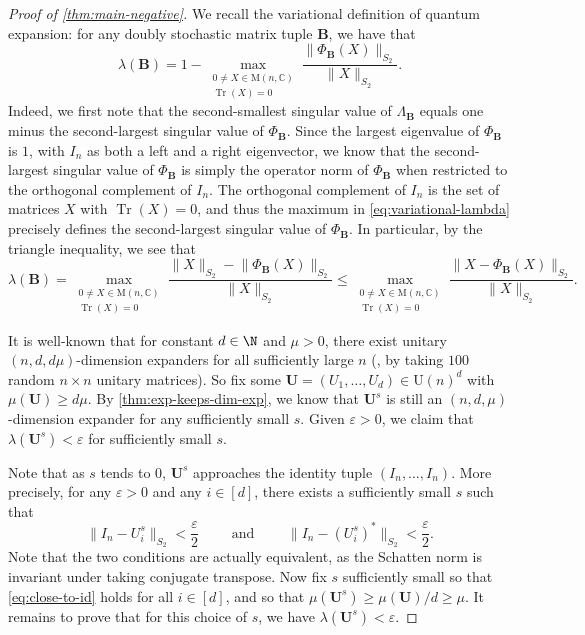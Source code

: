 \documentclass{toc}
\theoremstyle{plain}
\numberwithin{equation}{section}
\theoremstyle{definition}
\newcommand{\bC}{\mathbb{C}}
\DeclareMathOperator{\trace}{Tr}
\newcommand{\norm}[1]{\lVert#1\rVert}
\newcommand{\M}{\mathrm{M}}
\newcommand{\tuple}[1]{\mathbf{#1}}
\newcommand{\vB}{\tuple{B}}
\newcommand{\vU}{\tuple{U}}
\begin{document}
\begin{proof}[Proof of \cref{thm:main-negative}]

    We recall the variational definition of quantum expansion: for any doubly stochastic matrix tuple $\vB$, we have that
    \begin{equation}\label{eq:variational-lambda}
        \lambda(\vB) = 1- \max_{\substack{0 \neq X \in \M(n,\bC)\\\trace(X)=0}} \frac{\norm{\Phi_{\vB}(X)}_{S_2}}{\norm X_{S_2}}.
    \end{equation}
    Indeed, we first note that the second-smallest singular value of $\Lambda_{\vB}$ equals one minus the second-largest singular value of $\Phi_{\vB}$. Since the largest eigenvalue of $\Phi_{\vB}$ is $1$, with $I_n$ as both a left and a right eigenvector, we know that the second-largest singular value of $\Phi_{\vB}$ is simply the operator norm of $\Phi_{\vB}$ when restricted to the orthogonal complement of $I_n$. The orthogonal complement of $I_n$ is the set of matrices $X$ with $\trace(X)=0$, and thus the maximum in \eqref{eq:variational-lambda} precisely defines the second-largest singular value of $\Phi_{\vB}$. In particular, by the triangle inequality, we see that
    \begin{equation}
        \lambda(\vB) = \max_{\substack{0 \neq X \in \M(n,\bC)\\\trace(X)=0}} \frac{\norm X_{S_2} - \norm{\Phi_\vB(X)}_{S_2}}{\norm X_{S_2}} \leq \max_{\substack{0 \neq X \in \M(n,\bC)\\\trace(X)=0}} \frac{\norm{X-\Phi_\vB(X)}_{S_2}}{\norm X_{S_2}}. \label{eq:lambda-ub}
    \end{equation}

  It is well-known that for constant $d \in \N$ and $\mu>0$, there exist unitary $(n,d,d\mu)$-dimension expanders for all sufficiently large $n$ (\eg, by taking $100$ random $n \times n$ unitary matrices). So fix some $\vU=(U_1,\dots,U_d)\in \mathrm{U}(n)^d$ with $\mu(\vU) \geq d\mu$. By \cref{thm:exp-keeps-dim-exp}, we know that $\vU^s$ is still an $(n,d,\mu)$-dimension expander for any sufficiently small $s$. Given $\varepsilon>0$, we claim that $\lambda(\vU^s)< \varepsilon$ for sufficiently small $s$.

    Note that as $s$ tends to $0$, $\vU^s$ approaches the identity tuple $(I_n,\dots,I_n)$. More precisely, for any $\varepsilon>0$ and any $i\in[d]$, there exists a sufficiently small $s$ such that 
    \begin{equation}\label{eq:close-to-id}
         \norm{I_n - U_i^s}_{S_2}<\frac \varepsilon 2 \qquad \text{ and } \qquad \norm{I_n - (U_i^s)^*}_{S_2} < \frac \varepsilon 2.
    \end{equation}
    Note that the two conditions are actually equivalent, as the Schatten norm is invariant under taking conjugate transpose.
    Now fix $s$ sufficiently small so that \eqref{eq:close-to-id} holds for all $i \in [d]$, and so that $\mu(\vU^s) \geq \mu(\vU)/d \geq \mu$. It remains to prove that for this choice of $s$, we have $\lambda(\vU^s)<\varepsilon$. 


\end{proof}
\end{document}
